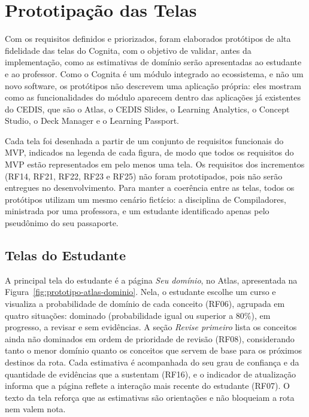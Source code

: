 \section{Prototipação das Telas}
\label{sec:prototipacao}

Com os requisitos definidos e priorizados, foram elaborados protótipos de alta fidelidade das telas do Cognita, com o objetivo de validar, antes da implementação, como as estimativas de domínio serão apresentadas ao estudante e ao professor. Como o Cognita é um módulo integrado ao ecossistema, e não um novo software, os protótipos não descrevem uma aplicação própria: eles mostram como as funcionalidades do módulo aparecem dentro das aplicações já existentes do CEDIS, que são o Atlas, o CEDIS Slides, o Learning Analytics, o Concept Studio, o Deck Manager e o Learning Passport.

Cada tela foi desenhada a partir de um conjunto de requisitos funcionais do MVP, indicados na legenda de cada figura, de modo que todos os requisitos do MVP estão representados em pelo menos uma tela. Os requisitos dos incrementos (RF14, RF21, RF22, RF23 e RF25) não foram prototipados, pois não serão entregues no desenvolvimento. Para manter a coerência entre as telas, todos os protótipos utilizam um mesmo cenário fictício: a disciplina de Compiladores, ministrada por uma professora, e um estudante identificado apenas pelo pseudônimo do seu passaporte.

\subsection{Telas do Estudante}
\label{subsec:prototipo-estudante}

A principal tela do estudante é a página \textit{Seu domínio}, no Atlas, apresentada na Figura~\ref{fig:prototipo-atlas-dominio}. Nela, o estudante escolhe um curso e visualiza a probabilidade de domínio de cada conceito (RF06), agrupada em quatro situações: dominado (probabilidade igual ou superior a 80\%), em progresso, a revisar e sem evidências. A seção \textit{Revise primeiro} lista os conceitos ainda não dominados em ordem de prioridade de revisão (RF08), considerando tanto o menor domínio quanto os conceitos que servem de base para os próximos destinos da rota. Cada estimativa é acompanhada do seu grau de confiança e da quantidade de evidências que a sustentam (RF16), e o indicador de atualização informa que a página reflete a interação mais recente do estudante (RF07). O texto da tela reforça que as estimativas são orientações e não bloqueiam a rota nem valem nota.

